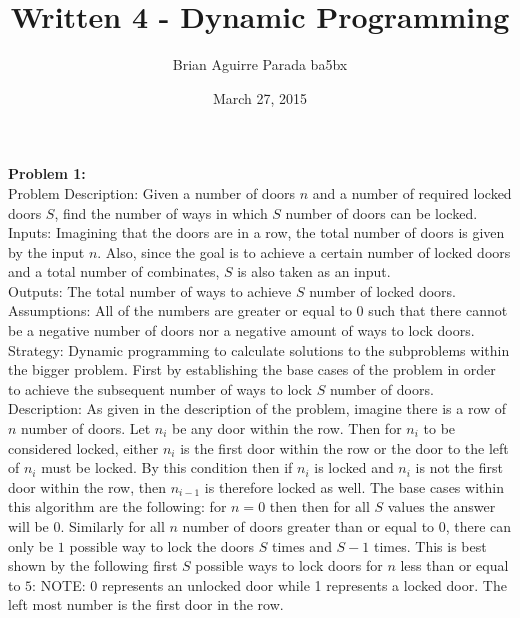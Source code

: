 \documentclass{article}
\title{Written 4 - Dynamic Programming}
\author{Brian Aguirre Parada ba5bx}
\date{March 27, 2015}
\begin{document}
\maketitle
\textbf{Problem 1:}\\
Problem Description: Given a number of doors $n$ and a number of required locked doors $S$, find the number of ways in which $S$ number of doors can be locked.\\
Inputs: Imagining that the doors are in a row, the total number of doors is given by the input $n$. Also, since the goal is to achieve a certain number of locked doors and a total number of combinates, $S$ is also taken as an input.\\
Outputs: The total number of ways to achieve $S$ number of locked doors.\\
Assumptions: All of the numbers are greater or equal to $0$ such that there cannot be a negative number of doors nor a negative amount of ways to lock doors.\\ 
Strategy: Dynamic programming to calculate solutions to the subproblems within the bigger problem. First by establishing the base cases of the problem in order to achieve the subsequent number of ways to lock $S$ number of doors. \\
Description: As given in the description of the problem, imagine there is a row of $n$ number of doors. Let $n_i$ be any door within the row. Then for $n_i$ to be considered locked, either $n_i$ is the first door within the row or the door to the left of $n_i$ must be locked. By this condition then if $n_i$ is locked and $n_i$ is not the first door within the row, then $n_{i-1}$ is therefore locked as well. The base cases within this algorithm are the following: for $n=0$ then then for all $S$ values the answer will be $0$. Similarly for all $n$ number of doors greater than or equal to 0, there can only be $1$ possible way to lock the doors $S$ times and $S-1$ times. This is best shown by the following first $S$ possible ways to lock doors for $n$ less than or equal to $5$: NOTE: 0 represents an unlocked door while 1 represents a locked door. The left most number is the first door in the row.
\end{document}
